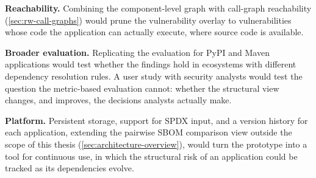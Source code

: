 \textbf{Reachability.} Combining the component-level graph with call-graph reachability (\autoref{sec:rw-call-graphs}) would prune the vulnerability overlay to vulnerabilities whose code the application can actually execute, where source code is available.

\textbf{Broader evaluation.} Replicating the evaluation for PyPI and Maven applications would test whether the findings hold in ecosystems with different dependency resolution rules. A user study with security analysts would test the question the metric-based evaluation cannot: whether the structural view changes, and improves, the decisions analysts actually make.

\textbf{Platform.} Persistent storage, support for SPDX input, and a version history for each application, extending the pairwise SBOM comparison view outside the scope of this thesis (\autoref{sec:architecture-overview}), would turn the prototype into a tool for continuous use, in which the structural risk of an application could be tracked as its dependencies evolve.
